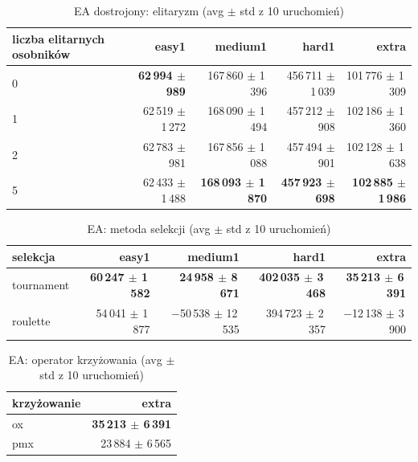 \begin{table}[H]
  \centering
  \small
  \caption{EA dostrojony: elitaryzm (avg $\pm$ std z 10 uruchomień)}
  \label{tab:ea-elite-tuned}
  \begin{tabular}{lrrrr}
    \toprule
    liczba elitarnych osobników & easy1 & medium1 & hard1 & extra \\
    \midrule
    0 & \textbf{62\,994 $\pm$ 989} & 167\,860 $\pm$ 1\,396 & 456\,711 $\pm$ 1\,039 & 101\,776 $\pm$ 1\,309 \\
    1 & 62\,519 $\pm$ 1\,272 & 168\,090 $\pm$ 1\,494 & 457\,212 $\pm$ 908 & 102\,186 $\pm$ 1\,360 \\
    2 & 62\,783 $\pm$ 981 & 167\,856 $\pm$ 1\,088 & 457\,494 $\pm$ 901 & 102\,128 $\pm$ 1\,638 \\
    5 & 62\,433 $\pm$ 1\,488 & \textbf{168\,093 $\pm$ 1\,870} & \textbf{457\,923 $\pm$ 698} & \textbf{102\,885 $\pm$ 1\,986} \\
    \bottomrule
  \end{tabular}
\end{table}

\begin{table}[H]
  \centering
  \small
  \caption{EA: metoda selekcji (avg $\pm$ std z 10 uruchomień)}
  \label{tab:ea-sel}
  \begin{tabular}{lrrrr}
    \toprule
    selekcja & easy1 & medium1 & hard1 & extra \\
    \midrule
    tournament & \textbf{60\,247 $\pm$ 1\,582} & \textbf{24\,958 $\pm$ 8\,671} & \textbf{402\,035 $\pm$ 3\,468} & \textbf{35\,213 $\pm$ 6\,391} \\
    roulette & 54\,041 $\pm$ 1\,877 & $-$50\,538 $\pm$ 12\,535 & 394\,723 $\pm$ 2\,357 & $-$12\,138 $\pm$ 3\,900 \\
    \bottomrule
  \end{tabular}
\end{table}

\begin{table}[H]
  \centering
  \small
  \caption{EA: operator krzyżowania (avg $\pm$ std z 10 uruchomień)}
  \label{tab:ea-cross}
  \begin{tabular}{lr}
    \toprule
    krzyżowanie & extra \\
    \midrule
    ox & \textbf{35\,213 $\pm$ 6\,391} \\
    pmx & 23\,884 $\pm$ 6\,565 \\
    \bottomrule
  \end{tabular}
\end{table}

